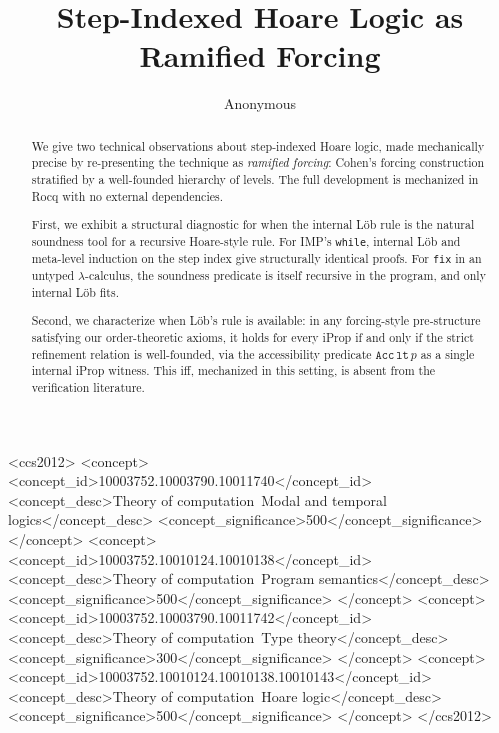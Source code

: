 \documentclass[sigplan,10pt,review,anonymous]{acmart}
\theoremstyle{plain}
\theoremstyle{definition}
\theoremstyle{remark}
\begin{document}
\title{Step-Indexed Hoare Logic as Ramified Forcing}

\author{Anonymous}

\begin{abstract}
We give two technical observations about step-indexed Hoare logic,
made mechanically precise by re-presenting the technique as
\emph{ramified forcing}: Cohen's forcing construction stratified by a
well-founded hierarchy of levels. The full development is mechanized
in Rocq with no external dependencies.

First, we exhibit a structural diagnostic for when the internal Löb
rule is the natural soundness tool for a recursive Hoare-style rule.
For IMP's \texttt{while}, internal Löb and meta-level induction on the
step index give structurally identical proofs. For \texttt{fix} in an
untyped $\lambda$-calculus, the soundness predicate is itself
recursive in the program, and only internal Löb fits.

Second, we characterize when L\"ob's rule is available: in any
forcing-style pre-structure satisfying our order-theoretic axioms, it
holds for every iProp if and only if the strict refinement relation
is well-founded, via the accessibility predicate
$\mathtt{Acc}\, \mathtt{lt}\, p$ as a single internal iProp witness.
This iff, mechanized in this setting, is absent from the verification
literature.
\end{abstract}

\begin{CCSXML}
<ccs2012>
   <concept>
       <concept_id>10003752.10003790.10011740</concept_id>
       <concept_desc>Theory of computation~Modal and temporal logics</concept_desc>
       <concept_significance>500</concept_significance>
   </concept>
   <concept>
       <concept_id>10003752.10010124.10010138</concept_id>
       <concept_desc>Theory of computation~Program semantics</concept_desc>
       <concept_significance>500</concept_significance>
   </concept>
   <concept>
       <concept_id>10003752.10003790.10011742</concept_id>
       <concept_desc>Theory of computation~Type theory</concept_desc>
       <concept_significance>300</concept_significance>
   </concept>
   <concept>
       <concept_id>10003752.10010124.10010138.10010143</concept_id>
       <concept_desc>Theory of computation~Hoare logic</concept_desc>
       <concept_significance>500</concept_significance>
   </concept>
</ccs2012>
\end{CCSXML}
\end{document}
